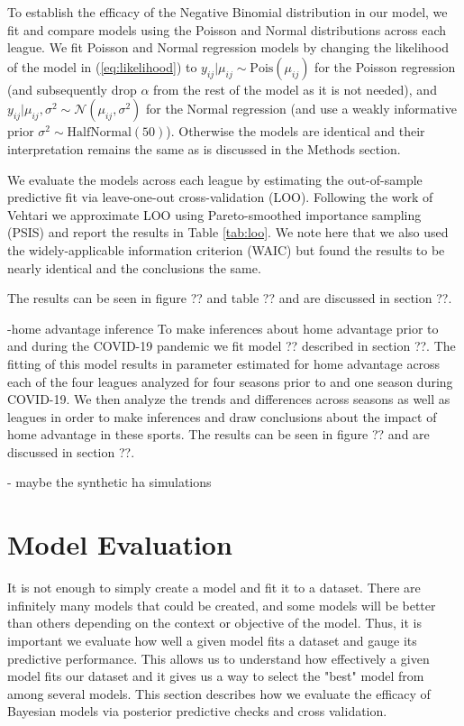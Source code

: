 To establish the efficacy of the Negative Binomial distribution in our model, we fit and compare models using the Poisson and Normal distributions across each league. We fit Poisson and Normal regression models by changing the likelihood of the model in (\ref{eq:likelihood}) to \(y_{ij} | \mu_{ij} \sim \text{Pois}(\mu_{ij})\) for the Poisson regression (and subsequently drop \(\alpha\) from the rest of the model as it is not needed), and \(y_{ij} | \mu_{ij}, \sigma^2 \sim \mathcal{N}(\mu_{ij}, \sigma^2)\) for the Normal regression (and use a weakly informative prior \(\sigma^2 \sim \text{HalfNormal}(50)\)). Otherwise the models are identical and their interpretation remains the same as is discussed in the Methods section.

We evaluate the models across each league by estimating the out-of-sample predictive fit via leave-one-out cross-validation (LOO). Following the work of Vehtari \cite{Vehtari2016} we approximate LOO using Pareto-smoothed importance sampling (PSIS) and report the results in Table \ref{tab:loo}. We note here that we also used the widely-applicable information criterion (WAIC) \cite{Watanabe2010} but found the results to be nearly identical and the conclusions the same.

The results can be seen in figure ?? and table ?? and are discussed in section ??.

-home advantage inference
To make inferences about home advantage prior to and during the COVID-19 pandemic we fit model ?? described in section ??. The fitting of this model results in parameter estimated for home advantage across each of the four leagues analyzed for four seasons prior to and one season during COVID-19. We then analyze the trends and differences across seasons as well as leagues in order to make inferences and draw conclusions about the impact of home advantage in these sports. The results can be seen in figure ?? and are discussed in section ??.

- maybe the synthetic ha simulations

\section{Model Evaluation}

It is not enough to simply create a model and fit it to a dataset. There are infinitely many models that could be created, and some models will be better than others depending on the context or objective of the model. Thus, it is important we evaluate how well a given model fits a dataset and gauge its predictive performance. This allows us to understand how effectively a given model fits our dataset and it gives us a way to select the "best" model from among several models. This section describes how we evaluate the efficacy of Bayesian models via posterior predictive checks and cross validation.

